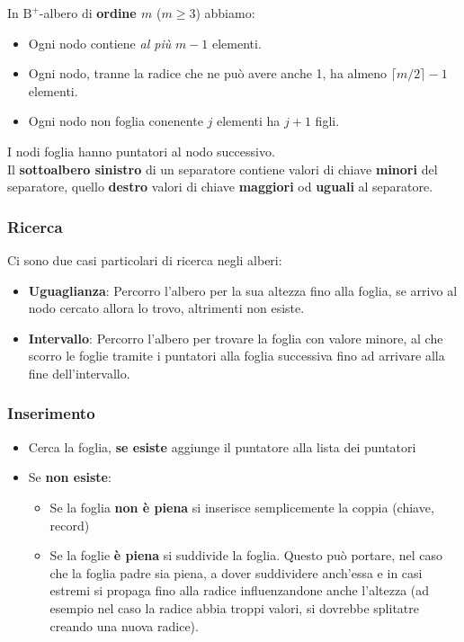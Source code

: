 \break

In $\text{B}^+$-albero di \textbf{ordine $m$} ($m \geq 3$) abbiamo:
\begin{itemize}
    \item Ogni nodo contiene \textit{al più} $m-1$ elementi.
    \item Ogni nodo, tranne la radice che ne può avere anche 1, ha almeno $\lceil m/2 \rceil - 1$ elementi.
    \item Ogni nodo non foglia conenente $j$ elementi ha $j+1$ figli.
\end{itemize}
I nodi foglia hanno puntatori al nodo successivo.\\
Il \textbf{sottoalbero sinistro} di un separatore contiene valori di chiave \textbf{minori} del separatore, quello \textbf{destro} valori di chiave \textbf{maggiori} od \textbf{uguali} al separatore.

\subsubsection{Ricerca}
Ci sono due casi particolari di ricerca negli alberi:
\begin{itemize}
    \item \textbf{Uguaglianza}: Percorro l'albero per la sua altezza fino alla foglia, se arrivo al nodo cercato allora lo trovo, altrimenti non esiste.
    \item \textbf{Intervallo}: Percorro l'albero per trovare la foglia con valore minore, al che scorro le foglie tramite i puntatori alla foglia successiva fino ad arrivare alla fine dell'intervallo.
\end{itemize}

\subsubsection{Inserimento}
\begin{itemize}
    \item Cerca la foglia, \textbf{se esiste} aggiunge il puntatore alla lista dei puntatori
    \item Se \textbf{non esiste}:
    \begin{itemize}
        \item Se la foglia \textbf{non \`e piena} si inserisce semplicemente la coppia (chiave, record)
        \item Se la foglie \textbf{\`e piena} si suddivide la foglia. Questo può portare, nel caso che la foglia padre sia piena, a dover suddividere anch'essa e in casi estremi si propaga fino alla radice influenzandone anche l'altezza (ad esempio nel caso la radice abbia troppi valori, si dovrebbe splitatre creando una nuova radice).
    \end{itemize}
\end{itemize}

